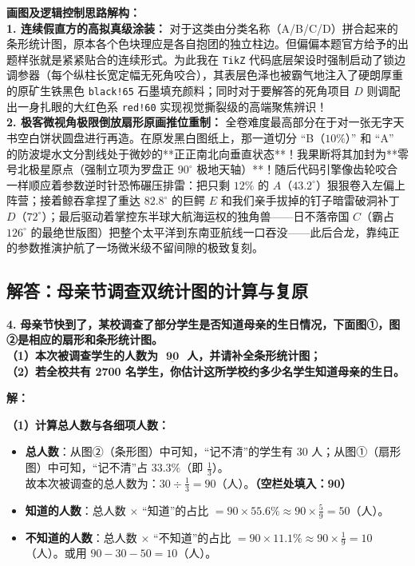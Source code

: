 \vspace{0.6cm}

{\small\color{blue!70!black}
\textbf{画图及逻辑控制思路解构：}\\
\textbf{1. 连续假直方的高拟真级涂装：} 对于这类由分类名称（A/B/C/D）拼合起来的条形统计图，原本各个色块理应是各自抱团的独立柱边。但偏偏本题官方给予的出题样张就是紧紧贴合的连续形式。为此我在 \texttt{TikZ} 代码底层架设时强制启动了锁边调参器（每个纵柱长宽定幅无死角咬合），其表层色泽也被霸气地注入了硬朗厚重的原矿生铁黑色 \texttt{black!65} 石墨填充颜料；同时对于要解答的死角项目 $D$ 则调配出一身扎眼的大红色系 \texttt{red!60} 实现视觉撕裂级的高端聚焦辨识！\\
\textbf{2. 极客微视角极限倒放扇形原画推位重制：} 全卷难度最高部分在于对一张无字天书空白饼状圆盘进行再造。在原发黑白图纸上，那一道切分 “B（$10\%$）” 和 “A” 的防波堤水文分割线处于微妙的**正正南北向垂直状态**！我果断将其加封为**零号北极星原点（强制立项为罗盘正 $90^\circ$ 极地天轴）**！随后代码引擎像齿轮咬合一样顺应着参数逆时针恐怖碾压排雷：把只剩 $12\%$ 的 $A$（$43.2^\circ$）狠狠卷入左偏上阵营；接着鲸吞拿捏了重达 $82.8^\circ$ 的巨鳄 $E$ 和我们亲手拔掉的钉子暗雷破洞补丁 $D$（$72^\circ$）；最后驱动着掌控东半球大航海运权的独角兽——日不落帝国 $C$（霸占 $126^\circ$ 的最绝世版图）把整个太平洋到东南亚航线一口吞没——此后合龙，靠纯正的参数推演护航了一场微米级不留间隙的极致复刻。
}

\newpage

\newpage

\subsection{解答：母亲节调查双统计图的计算与复原}

\vspace{0.6cm}

\textbf{\LARGE 4.} \textbf{母亲节快到了，某校调查了部分学生是否知道母亲的生日情况，下面图①，图②是相应的扇形和条形统计图。\\
（1）本次被调查学生的人数为 $\underline{\textbf{    90    }}$ 人，并请补全条形统计图；\\
（2）若全校共有 2700 名学生，你估计这所学校约多少名学生知道母亲的生日。}

\vspace{0.4cm}
\textbf{解：}

\textbf{（1）计算总人数与各细项人数：}
\begin{itemize}
    \item \textbf{总人数}：从图②（条形图）中可知，“记不清”的学生有 $30$ 人；从图①（扇形图）中可知，“记不清”占 $33.3\%$（即 $\frac{1}{3}$）。\\
    故本次被调查的总人数为：$30 \div \frac{1}{3} = 90$（人）。\textbf{（空栏处填入：90）}
    \item \textbf{知道的人数}：总人数 $\times$ “知道”的占比 $= 90 \times 55.6\% \approx 90 \times \frac{5}{9} = 50$（人）。
    \item \textbf{不知道的人数}：总人数 $\times$ “不知道”的占比 $= 90 \times 11.1\% \approx 90 \times \frac{1}{9} = 10$（人）。或用 $90 - 30 - 50 = 10$（人）。
\end{itemize}

